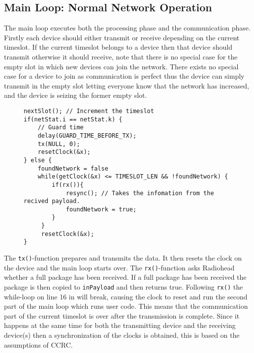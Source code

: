 \subsection{Main Loop: Normal Network Operation}
The main loop executes both the processing phase and the communication phase.
Firstly each device should either transmit or receive depending on the current timeslot. 
If the current timeslot belongs to a device then that device should transmit otherwise it should receive, note that there is no special case for the empty slot in which new devices can join the network.
There exists no special case for a device to join as communication is perfect thus the device can simply transmit in the empty slot letting everyone know that the network has increased, and the device is seizing the former empty slot.
\begin{figure}
\begin{lstlisting}[style=customc,caption={Main loop deciding whether to transmit or receive.},label={lst:ccrc:rxortx}]
nextSlot(); // Increment the timeslot
if(netStat.i == netStat.k) {
    // Guard time
    delay(GUARD_TIME_BEFORE_TX);
    tx(NULL, 0);
    resetClock(&x);
} else {
    foundNetwork = false
    while(getClock(&x) <= TIMESLOT_LEN && !foundNetwork) {
        if(rx()){
            resync(); // Takes the infomation from the recived payload.
            foundNetwork = true;
        }
     }
     resetClock(&x);
}
\end{lstlisting}
\end{figure}

\bigskip \noindent
The \texttt{tx()}-function prepares and transmits the data.
It then resets the clock on the device and the main loop starts over.
The \texttt{rx()}-function asks Radiohead whether a full package has been received. 
If a full package has been received the package is then copied to \texttt{inPayload} and then returns true.
Following \texttt{rx()} the while-loop on line 16 in  will break, causing the clock to reset and run the second part of the main loop which runs user code.
This means that the communication part of the current timeslot is over after the transmission is complete.
Since it happens at the same time for both the transmitting device and the receiving device(s) then a synchronization of the clocks is obtained, this is based on the assumptions of CCRC. 